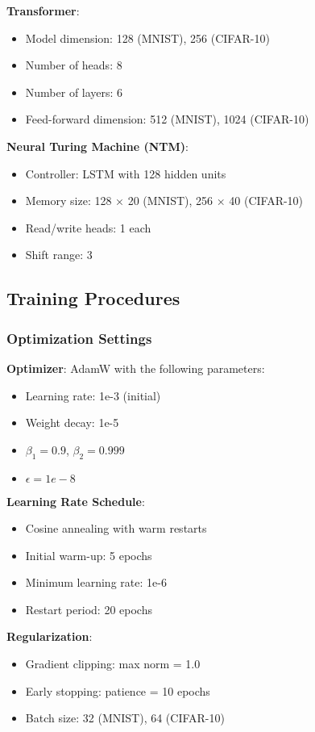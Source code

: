 \textbf{Transformer}:
\begin{itemize}
    \item Model dimension: 128 (MNIST), 256 (CIFAR-10)
    \item Number of heads: 8
    \item Number of layers: 6
    \item Feed-forward dimension: 512 (MNIST), 1024 (CIFAR-10)
\end{itemize}

\textbf{Neural Turing Machine (NTM)}:
\begin{itemize}
    \item Controller: LSTM with 128 hidden units
    \item Memory size: 128 × 20 (MNIST), 256 × 40 (CIFAR-10)
    \item Read/write heads: 1 each
    \item Shift range: 3
\end{itemize}

\subsection{Training Procedures}

\subsubsection{Optimization Settings}

\textbf{Optimizer}: AdamW with the following parameters:
\begin{itemize}
    \item Learning rate: 1e-3 (initial)
    \item Weight decay: 1e-5
    \item $\beta_1 = 0.9$, $\beta_2 = 0.999$
    \item $\epsilon = 1e-8$
\end{itemize}

\textbf{Learning Rate Schedule}:
\begin{itemize}
    \item Cosine annealing with warm restarts
    \item Initial warm-up: 5 epochs
    \item Minimum learning rate: 1e-6
    \item Restart period: 20 epochs
\end{itemize}

\textbf{Regularization}:
\begin{itemize}
    \item Gradient clipping: max norm = 1.0
    \item Early stopping: patience = 10 epochs
    \item Batch size: 32 (MNIST), 64 (CIFAR-10)
\end{itemize}

